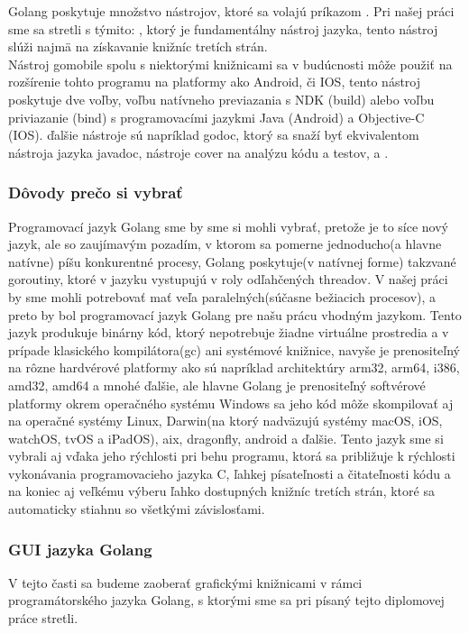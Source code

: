 \tab[5 mm] Golang poskytuje množstvo nástrojov, ktoré sa volajú príkazom . Pri našej práci sme sa stretli s týmito:  , ktorý je
fundamentálny nástroj jazyka, tento nástroj slúži najmä na získavanie knižníc tretích strán. \\
Nástroj gomobile \cite{GOlang15} spolu s niektorými knižnicami sa v budúcnosti môže použiť na rozšírenie tohto programu na platformy ako Android, či IOS, tento
nástroj poskytuje dve voľby, voľbu natívneho previazania s NDK (build) alebo voľbu priviazanie (bind) s programovacími jazykmi Java (Android) a Objective-C (IOS). \cite{GOlang16} ďalšie nástroje sú napríklad godoc, ktorý sa snaží byť ekvivalentom nástroja jazyka javadoc, nástroje cover na analýzu kódu a testov,  a .  
\subsubsection{Dôvody prečo si vybrať}
\tab[5 mm] Programovací jazyk Golang sme by sme si mohli vybrať, pretože je to síce nový jazyk, ale so zaujímavým pozadím, v ktorom sa pomerne jednoducho(a hlavne natívne) píšu konkurentné procesy, Golang poskytuje(v natívnej forme) takzvané goroutiny,  ktoré v jazyku vystupujú v roly odľahčených threadov. V našej práci by sme mohli potrebovať mať veľa paralelných(súčasne bežiacich procesov), a preto by bol programovací jazyk Golang pre našu prácu vhodným jazykom. Tento jazyk produkuje binárny kód, ktorý nepotrebuje žiadne virtuálne prostredia a v prípade klasického kompilátora(gc) ani systémové knižnice, navyše je prenositeľný na rôzne hardvérové platformy ako sú napríklad architektúry arm32, arm64, i386, amd32, amd64 a mnohé ďalšie, ale hlavne Golang je prenositeľný softvérové platformy okrem operačného systému Windows sa jeho kód môže skompilovať aj na operačné systémy Linux, Darwin(na ktorý nadväzujú systémy macOS, iOS, watchOS, tvOS a iPadOS), aix, dragonfly, android a ďalšie. Tento jazyk sme si vybrali aj vďaka jeho rýchlosti pri behu programu, ktorá sa približuje k rýchlosti vykonávania programovacieho jazyka C, ľahkej písateľnosti a čitateľnosti kódu a na koniec aj veľkému výberu ľahko dostupných knižníc tretích strán, ktoré sa automaticky stiahnu so všetkými závislosťami.
\subsubsection{GUI jazyka Golang}
\tab[5 mm] V tejto časti sa budeme zaoberať grafickými knižnicami v rámci programátorského jazyka Golang, s ktorými sme sa pri písaný tejto diplomovej práce stretli.
